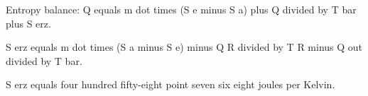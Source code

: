 Entropy balance:  
Q equals m dot times (S e minus S a) plus Q divided by T bar plus S erz.  

S erz equals m dot times (S a minus S e) minus Q R divided by T R minus Q out divided by T bar.  

S erz equals four hundred fifty-eight point seven six eight joules per Kelvin.